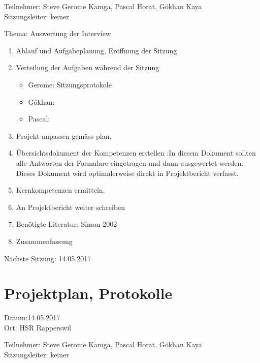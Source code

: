Teilnehmer: Steve Gerome Kamga, Pascal Horat, Gökhan Kaya\\
Sitzungsleiter: keiner

Thema: Auswertung der Interview

\begin{enumerate}

\item Ablauf und Aufgabeplanung, Eröffnung der Sitzung 

\item  Verteilung der Aufgaben während der Sitzung
\begin{itemize}
\item Gerome: Sitzungsprotokole
\item Gökhan: 
\item Pascal: 
\end{itemize}

\item	Projekt anpassen gemäss plan.


\item 	Übersichtsdokument der Kompetenzen erstellen :In diesem Dokument sollten alle Antworten der Formulare eingetragen und dann ausgewertet werden. Dieses Dokument wird optimalerweise direkt in Projektbericht verfasst.

\item 	Kernkompetenzen ermitteln.

\item 	An Projektbericht weiter schreiben

\item Benötigte Literatur: Simon 2002   \cite{simon2002entwicklung}

\item Zusammenfassung

\end{enumerate}

Nächste Sitzung: 14.05.2017

\newpage
\section*{Projektplan, Protokolle}

Datum:14.05.2017\\
Ort: HSR Rapperswil

Teilnehmer: Steve Gerome Kamga, Pascal Horat, Gökhan Kaya\\
Sitzungsleiter: keiner

